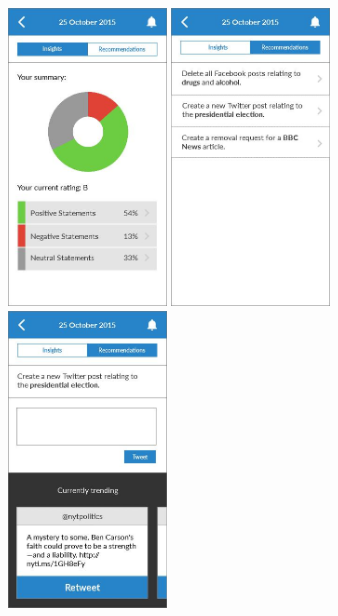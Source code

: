 \begin{figure}
  \subfigures
  \centering
  \begin{minipage}{4.6cm}
    \centering
    \includegraphics[width=4.2cm]{inc/ui_recommendation_step1.jpg}
    \caption{}
    \label{fig:ui_recommendation_step1}
  \end{minipage}
  \begin{minipage}{4.6cm}
    \centering
    \includegraphics[width=4.2cm]{inc/ui_recommendation_step2.jpg}
    \caption{}
    \label{fig:ui_recommendation_step2}
  \end{minipage}
  \begin{minipage}{4.6cm}
    \centering
    \includegraphics[width=4.2cm]{inc/ui_recommendation_step3.jpg}
    \caption{}
    \label{fig:ui_recommendation_step3}
  \end{minipage}
\end{figure}

